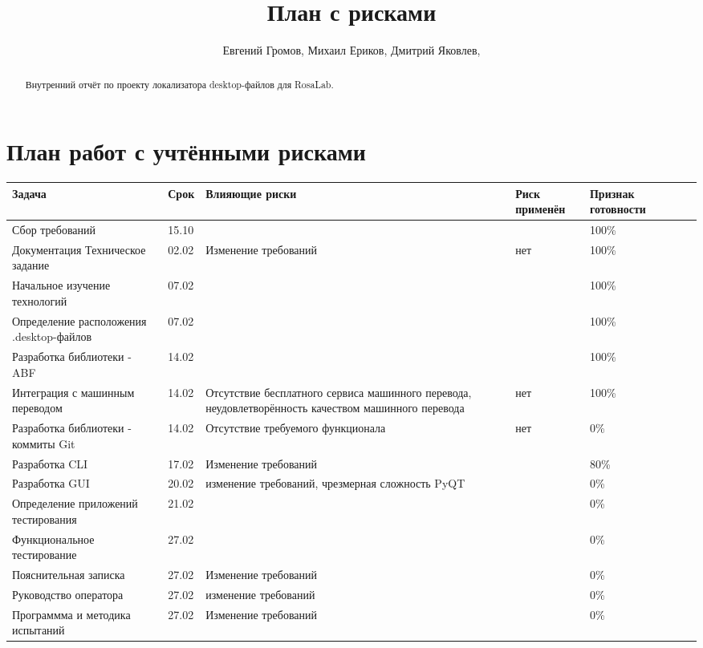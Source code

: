 \documentclass[12pt,a4paper]{article}
\author{Евгений Громов, Михаил Ериков, Дмитрий Яковлев,}
\title{План с рисками}
\begin{document}
	\maketitle
	\begin{abstract}
		Внутренний отчёт по проекту локализатора desktop-файлов для RosaLab.
	\end{abstract}
	\section{План работ с учтёнными рисками}
		\begin{tabular}{| p{4cm} | l | p{5cm} | l | p{4cm} | l | l |}
			\hline
	Задача & Срок & Влияющие риски & Риск применён & Признак готовности \\ \hline
	
	Сбор требований & 15.10 &  & & 100\% \\ \hline
	Документация Техническое задание & 02.02 & Изменение требований & нет & 100\% \\ \hline
	
	Начальное изучение технологий & 07.02 & & & 100\% \\ \hline
	Определение расположения .desktop-файлов & 07.02 & & & 100\% \\ \hline

	Разработка библиотеки - ABF & 14.02 & & & 100\% \\ \hline
	Интеграция с машинным переводом & 14.02 & Отсутствие бесплатного сервиса машинного перевода, неудовлетворённость качеством машинного перевода & нет & 100\% \\ \hline
		Разработка библиотеки - коммиты Git & 14.02 & Отсутствие требуемого функционала & нет & 0\% \\ \hline
	Разработка CLI & 17.02 & Изменение требований & & 80\% \\ \hline
	Разработка GUI & 20.02 & изменение требований, чрезмерная сложность PyQT & & 0\%  \\ \hline
	Определение приложений тестирования & 21.02 & & & 0\% \\ \hline
	Функциональное тестирование & 27.02 & & & 0\% \\ \hline
	Пояснительная записка &27.02 & Изменение требований & & 0\% \\ \hline
	Руководство оператора & 27.02 & изменение требований & & 0\% \\ \hline
	Программма и методика испытаний & 27.02 & Изменение требований & & 0\% \\ \hline
		\end{tabular}
\end{document}

